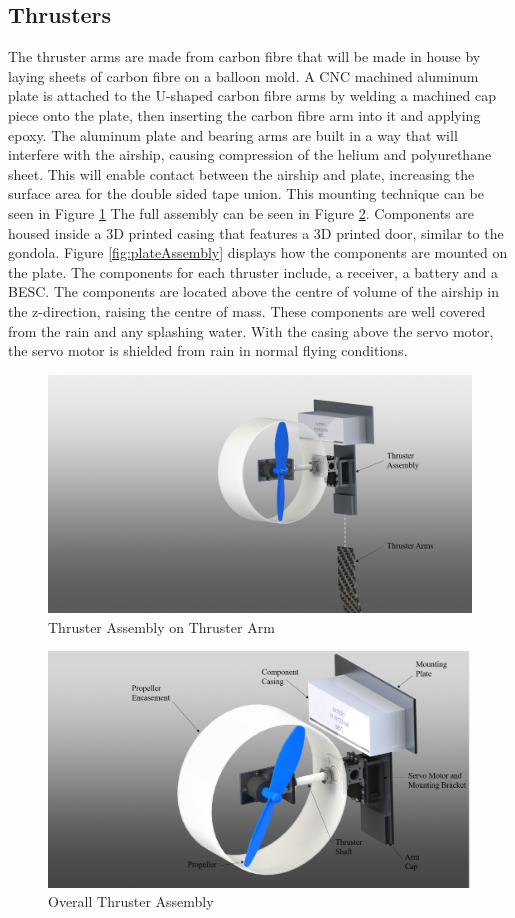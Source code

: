 \documentclass[../main.tex]{subfiles}
\begin{document}
\subsection{Thrusters}
The thruster arms are made from carbon fibre that will be made in house by laying sheets of carbon fibre on a balloon mold. A CNC machined aluminum plate is attached to the U-shaped carbon fibre arms by welding a machined cap piece onto the plate, then inserting the carbon fibre arm into it and applying epoxy. The aluminum plate and bearing arms are built in a way that will interfere with the airship, causing compression of the helium and polyurethane sheet. This will enable contact between the airship and plate, increasing the surface area for the double sided tape union. This mounting technique can be seen in Figure \ref{fig:thrusterOnKeel} The full assembly can be seen in Figure \ref{fig:thrusterAssembly}.  Components are housed inside a 3D printed casing that features a 3D printed door, similar to the gondola. Figure \ref{fig:plateAssembly} displays how the components are mounted on the plate. The components for each thruster include, a receiver, a battery and a BESC. The components are located above the centre of volume of the airship in the z-direction, raising the centre of mass. These components are well covered from the rain and any splashing water. With the casing above the servo motor, the servo motor is shielded from rain in normal flying conditions.\\
\begin{figure}[H]
	\centering
	\includegraphics[width=.8\linewidth]{img/design/thruster/thrusterOnKeel.png}
	\caption{Thruster Assembly on Thruster Arm}
	\label{fig:thrusterOnKeel}
\end{figure}

\begin{figure}[H]
	\centering
	\includegraphics[width=.8\linewidth]{img/design/thruster/thrusterAssembly.png}
	\caption{Overall Thruster Assembly}
	\label{fig:thrusterAssembly}
\end{figure}
\end{document}
